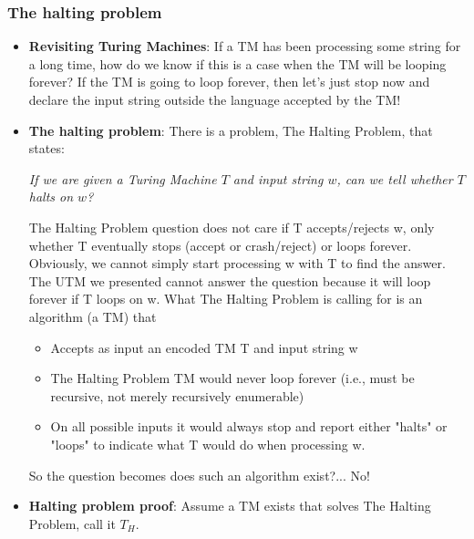\documentclass{report}
\begin{document}
    \subsubsection{The halting problem}
    \bigbreak \noindent 
    \begin{itemize}
        \item \textbf{Revisiting Turing Machines}: If a TM has been processing some string for a long time, how do we know if this is a case when the TM will be looping forever?
            \bigbreak \noindent 
            If the TM is going to loop forever, then let's just stop now and declare the input string outside the language accepted by the TM!
        \item \textbf{The halting problem}: There is a problem, The Halting Problem, that states:
            \bigbreak \noindent 
            \begin{center}
                \textit{If we are given a Turing Machine $T$ and input string $w$, can we tell whether $T$ halts on $w$?}
            \end{center}
            \bigbreak \noindent 
            The Halting Problem question does not care if T accepts/rejects w, only whether T eventually stops (accept or crash/reject) or loops forever.
            \bigbreak \noindent 
            Obviously, we cannot simply start processing w with T to find the answer.
            \bigbreak \noindent 
            The UTM we presented cannot answer the question because it will loop forever if T loops on w.
            \bigbreak \noindent 
            What The Halting Problem is calling for is an algorithm (a TM) that
            \begin{itemize}
                \item Accepts as input an encoded TM T and input string w
                \item The Halting Problem TM would never loop forever (i.e., must be recursive, not merely recursively enumerable)
                \bigbreak \noindent 
            \item On all possible inputs it would always stop and report either "halts" or "loops" to indicate what T would do when processing w.
                \bigbreak \noindent 
            \end{itemize}
            So the question becomes does such an algorithm exist?... No!
            \bigbreak \noindent 
        \item \textbf{Halting problem proof}: Assume a TM exists that solves The Halting Problem, call it $T_{H}$.

\end{itemize}
\end{document}
